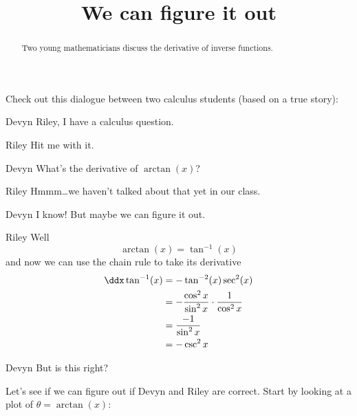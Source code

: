 \documentclass{ximera}
\title[Break-Ground:]{We can figure it out}
\begin{document}
\begin{abstract}
Two young mathematicians discuss the derivative of inverse functions.
\end{abstract}
\maketitle

Check out this dialogue between two calculus students (based on a true
story):

\begin{dialogue}
\item[Devyn] Riley, I have a calculus question.
\item[Riley] Hit me with it.
\item[Devyn] What's the derivative of $\arctan(x)$?
\item[Riley] Hmmm\dots we haven't talked about that yet in our class.
\item[Devyn] I know! But maybe we can figure it out.
\item[Riley] Well
  \[
  \arctan(x) = \tan^{-1}(x)
  \]
  and now we can use the chain rule to take its derivative
  \begin{align*}
    \ddx \tan^{-1}(x) &= -\tan^{-2}(x)\sec^2(x)\\
    &= -\frac{\cos^2x}{\sin^2x}\cdot \frac{1}{\cos^2x}\\
    &= \frac{-1}{\sin^2x}\\
    &= -\csc^2x
  \end{align*}
\item[Devyn] But is this right?
\end{dialogue}

Let's see if we can figure out if Devyn and Riley are correct. Start by looking at a plot of $\theta = \arctan(x)$:

\begin{image}
\end{image}
\end{document}
